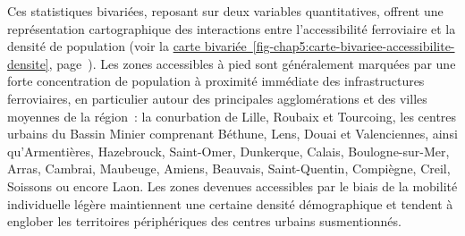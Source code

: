 \begin{refsegment}

Ces statistiques bivariées, reposant sur deux variables quantitatives, offrent une représentation cartographique des interactions entre l'accessibilité ferroviaire et la densité de population (voir la \hyperref[fig-chap5:carte-bivariee-accessibilite-densite]{carte bivariée~\ref{fig-chap5:carte-bivariee-accessibilite-densite}}, page~\pageref{fig-chap5:carte-bivariee-accessibilite-densite}). Les zones accessibles à pied sont généralement marquées par une forte concentration de population à proximité immédiate des infrastructures ferroviaires, en particulier autour des principales agglomérations et des villes moyennes de la région~: la \gls{conurbation} de Lille, Roubaix et Tourcoing, les centres urbains du Bassin Minier comprenant Béthune, Lens, Douai et Valenciennes, ainsi qu'Armentières, Hazebrouck, Saint-Omer, Dunkerque, Calais, Boulogne-sur-Mer, Arras, Cambrai, Maubeuge, Amiens, Beauvais, Saint-Quentin, Compiègne, Creil, Soissons ou encore Laon. Les zones devenues accessibles par le biais de la mobilité individuelle légère maintiennent une certaine densité démographique et tendent à englober les territoires périphériques des centres urbains susmentionnés.%


\end{refsegment}
